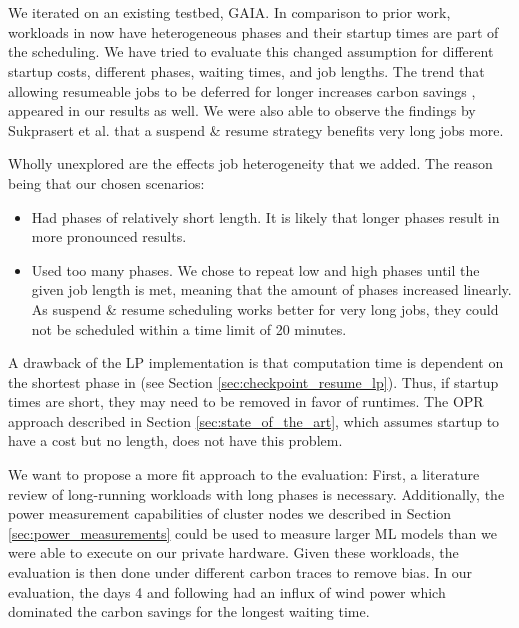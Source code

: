 \section{\programname{}}

We iterated on an existing testbed, GAIA.
In comparison to prior work, workloads in \programname{} now have heterogeneous phases and their startup times are part of the scheduling.
We have tried to evaluate this changed assumption for different startup costs, different phases, waiting times, and job lengths. 
The trend that allowing resumeable jobs to be deferred for longer increases carbon savings \cite{wiesner_lets_2021,hanafy_going_2024, hanafy_war_2023}, appeared in our results as well. 
We were also able to observe the findings by Sukprasert et al. \cite{sukprasert_limitations_2024} that a suspend \& resume strategy benefits very long jobs more.

Wholly unexplored are the effects job heterogeneity that we added.
The reason being that our chosen scenarios:

\begin{itemize}
    \item Had phases of relatively short length. It is likely that longer phases result in more pronounced results.
    \item Used too many phases. We chose to repeat low and high phases until the given job length is met, meaning that the amount of phases increased linearly. As suspend \& resume scheduling works better for very long jobs, they could not be scheduled within a time limit of 20 minutes.
\end{itemize}

A drawback of the LP implementation is that computation time is dependent on the shortest phase in \modelname{} (see Section \ref{sec:checkpoint_resume_lp}). Thus, if startup times are short, they may need to be removed in favor of runtimes. The OPR approach described in Section \ref{sec:state_of_the_art}, which assumes startup to have a cost but no length, does not have this problem.

We want to propose a more fit approach to the evaluation:
First, a literature review of long-running workloads with long phases is necessary. Additionally, the power measurement capabilities of cluster nodes we described in Section \ref{sec:power_measurements} could be used to measure larger ML models than we were able to execute on our private hardware.
Given these workloads, the evaluation is then done under different carbon traces to remove bias.
In our evaluation, the days 4 and following had an influx of wind power which dominated the carbon savings for the longest waiting time. 

